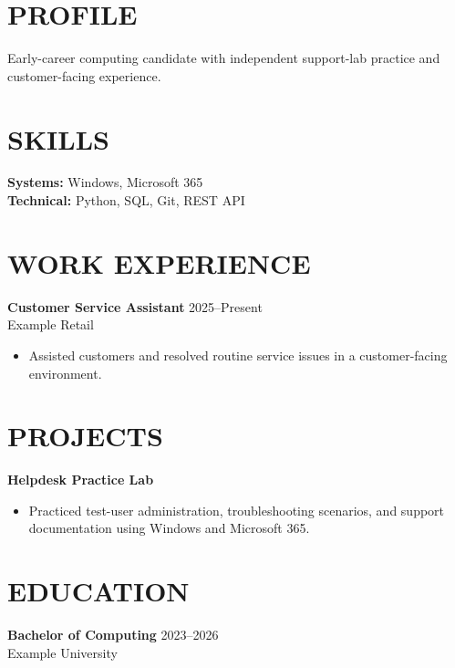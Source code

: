 

\section{PROFILE}
Early-career computing candidate with independent support-lab practice and customer-facing experience.
\section{SKILLS}
\textbf{Systems:} Windows, Microsoft 365\\
\textbf{Technical:} Python, SQL, Git, REST API
\section{WORK EXPERIENCE}
\textbf{Customer Service Assistant} \hfill 2025--Present\\
Example Retail
\begin{itemize}
\item Assisted customers and resolved routine service issues in a customer-facing environment.
\end{itemize}
\section{PROJECTS}
\textbf{Helpdesk Practice Lab}
\begin{itemize}
\item Practiced test-user administration, troubleshooting scenarios, and support documentation using Windows and Microsoft 365.
\end{itemize}
\section{EDUCATION}
\textbf{Bachelor of Computing} \hfill 2023--2026\\
Example University

